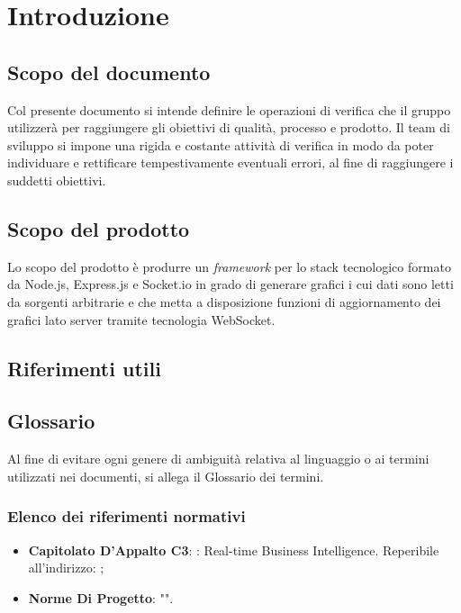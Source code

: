 
\section{Introduzione}
	\subsection{Scopo del documento}
		Col presente documento si intende definire le operazioni di verifica che il gruppo \groupname{} utilizzerà per raggiungere gli obiettivi di qualità, processo e prodotto. Il team di sviluppo si impone una rigida e costante attività di verifica in modo da poter individuare e rettificare tempestivamente eventuali errori, al fine di raggiungere i suddetti obiettivi. 
	\subsection{Scopo del prodotto}
		Lo scopo del prodotto è produrre un \textit{framework} per lo stack tecnologico formato da Node.js, Express.js e Socket.io in grado di generare grafici i cui dati sono letti da sorgenti arbitrarie e che metta a disposizione funzioni di aggiornamento dei grafici lato server tramite tecnologia WebSocket.
	\subsection{Riferimenti utili}
		\subsection{Glossario}
			Al fine di evitare ogni genere di ambiguità relativa al linguaggio o ai termini utilizzati nei documenti, si allega il Glossario dei termini.
		\subsubsection{Elenco dei riferimenti normativi}
			\begin{itemize}
				\item \textbf{Capitolato D'Appalto C3}: \projectname{}: Real-time Business Intelligence. Reperibile all'indirizzo: ;
				\item \textbf{Norme Di Progetto}: "".
			\end{itemize}
